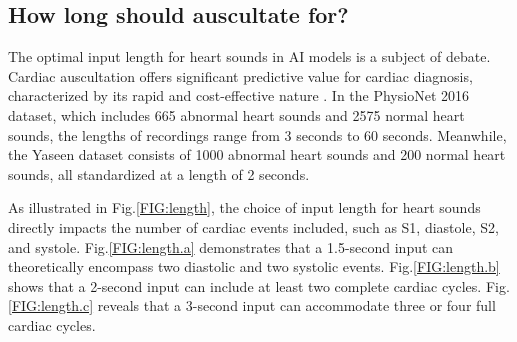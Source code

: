 \subsection{How long should auscultate for?}
The optimal input length for heart sounds in AI models is a subject of debate. Cardiac auscultation offers significant predictive value for cardiac diagnosis, characterized by its rapid and cost-effective nature \cite{taylor2015learning}. In the PhysioNet 2016 dataset, which includes 665 abnormal heart sounds and 2575 normal heart sounds, the lengths of recordings range from 3 seconds to 60 seconds. Meanwhile, the Yaseen dataset consists of 1000 abnormal heart sounds and 200 normal heart sounds, all standardized at a length of 2 seconds.

As illustrated in Fig.\ref{FIG:length}, the choice of input length for heart sounds directly impacts the number of cardiac events included, such as S1, diastole, S2, and systole. Fig.\ref{FIG:length.a} demonstrates that a 1.5-second input can theoretically encompass two diastolic and two systolic events. Fig.\ref{FIG:length.b} shows that a 2-second input can include at least two complete cardiac cycles. Fig.\ref{FIG:length.c} reveals that a 3-second input can accommodate three or four full cardiac cycles. 

